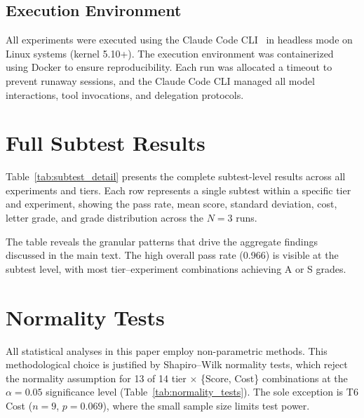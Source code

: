 \documentclass[11pt]{article}
\begin{document}
\subsection{Execution Environment}

All experiments were executed using the Claude Code CLI~\cite{anthropic2024claude}
in headless mode on Linux systems (kernel 5.10+). The execution environment
was containerized using Docker to ensure reproducibility. Each run was
allocated a timeout to prevent runaway sessions, and the Claude Code CLI
managed all model interactions, tool invocations, and delegation protocols.

\section{Full Subtest Results}
\label{app:subtest_results}

Table~\ref{tab:subtest_detail} presents the complete subtest-level results
across all experiments and tiers. Each row represents a single subtest within
a specific tier and experiment, showing the pass rate, mean score, standard
deviation, cost, letter grade, and grade distribution across the $N=3$ runs.

The table reveals the granular patterns that drive the aggregate findings
discussed in the main text. The high overall pass rate (0.966) is visible
at the subtest level, with most tier--experiment combinations achieving
A or S grades.



\section{Normality Tests}
\label{app:normality}

All statistical analyses in this paper employ non-parametric methods. This
methodological choice is justified by Shapiro--Wilk normality tests, which
reject the normality assumption for 13 of 14 tier $\times$ \{Score, Cost\}
combinations at the $\alpha = 0.05$ significance level
(Table~\ref{tab:normality_tests}). The sole exception is T6 Cost ($n=9$,
$p=0.069$), where the small sample size limits test power.
\end{document}
